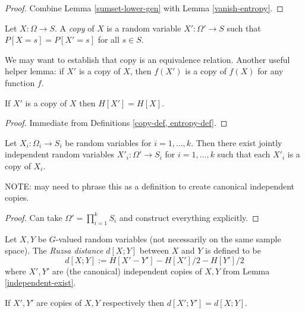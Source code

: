 \begin{proof}  Combine Lemma \ref{sumset-lower-gen} with Lemma \ref{vanish-entropy}.
\end{proof}

\begin{definition}[Copy]\label{copy-def}  Let $X : \Omega \to S$.  A \emph{copy} of $X$ is a random variable $X' : \Omega' \to S$ such that $P[X=s] = P[X'=s]$ for all $s \in S$.
\end{definition}

We may want to establish that copy is an equivalence relation. Another useful helper lemma: if $X'$ is a copy of $X$, then $f(X')$ is a copy of $f(X)$ for any function $f$.

\begin{lemma}\label{copy-ent} If $X'$ is a copy of $X$ then $H[X'] = H[X]$.
\end{lemma}

\begin{proof} Immediate from Definitions \ref{copy-def, entropy-def}.
\end{proof}

\begin{lemma}\label{independent-exist}  Let $X_i : \Omega_i \to S_i$ be random variables for $i=1,\dots,k$.  Then there exist jointly independent random variables $X'_i: \Omega' \to S_i$ for $i=1,\dots,k$ such that each $X'_i$ is a copy of $X_i$.
\end{lemma}

NOTE: may need to phrase this as a definition to create canonical independent copies.

\begin{proof} Can take $\Omega' = \prod_{i=1}^k S_i$ and construct everything explicitly.
\end{proof}

\begin{definition}\label{ruz-dist-def}  Let $X,Y$ be $G$-valued random variables (not necessarily on the same sample space).  The \emph{Ruzsa distance} $d[X;Y]$ between $X$ and $Y$ is defined to be
$$ d[X;Y] := H[X' - Y'] - H[X']/2 - H[Y']/2$$
where $X',Y'$ are (the canonical) independent copies of $X,Y$ from Lemma \ref{independent-exist}.
\end{definition}

\begin{lemma}\label{ruz-copy}  If $X',Y'$ are copies of $X,Y$ respectively then $d[X';Y']=d[X;Y]$.
\end{lemma}

